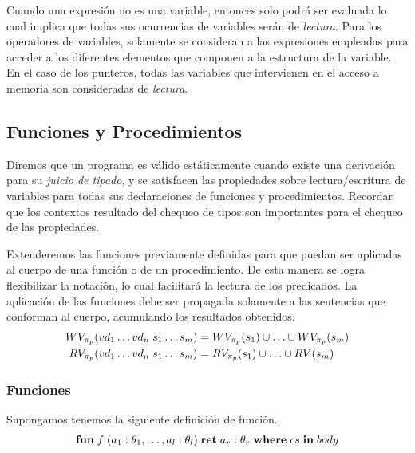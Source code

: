 Cuando una expresión no es una variable, entonces solo podrá ser evaluada lo cual implica que todas sus ocurrencias de variables serán de \textit{lectura}.
Para los operadores de variables, solamente se consideran a las expresiones empleadas para acceder a los diferentes elementos que componen a la estructura de la variable.
En el caso de los punteros, todas las variables que intervienen en el acceso a memoria son consideradas de \textit{lectura}.

\subsection{Funciones y Procedimientos}

Diremos que un programa es válido estáticamente cuando existe una derivación para su \textit{juicio de tipado}, y se satisfacen las propiedades sobre lectura/escritura de variables para todas sus declaraciones de funciones y procedimientos. Recordar que los contextos resultado del chequeo de tipos son
importantes para el chequeo de las propiedades.

Extenderemos las funciones previamente definidas para que puedan ser aplicadas al cuerpo de una función o de un procedimiento.
De esta manera se logra flexibilizar la notación, lo cual facilitará la lectura de los predicados.
La aplicación de las funciones debe ser propagada solamente a las sentencias que conforman al cuerpo, acumulando los resultados obtenidos.
\begin{align*}
WV_{\pi_{p}}(vd_1 \ldots vd_n \; s_1 \ldots s_m) &= WV_{\pi_{p}}(s_1) \cup \ldots \cup WV_{\pi_{p}}(s_m)
\\
RV_{\pi_{p}}(vd_1 \ldots vd_n \; s_1 \ldots s_m) &= RV_{\pi_{p}}(s_1) \cup \ldots \cup RV(s_m)
\end{align*}

\subsubsection{Funciones}

Supongamos tenemos la siguiente definición de función.
\begin{gather*}
\mathbf{fun} \; f \; (a_1: \theta_1, \ldots, a_l: \theta_l) \; \mathbf{ret} \; a_r: \theta_r \; \mathbf{where} \; cs \; \mathbf{in} \; body
\end{gather*}

